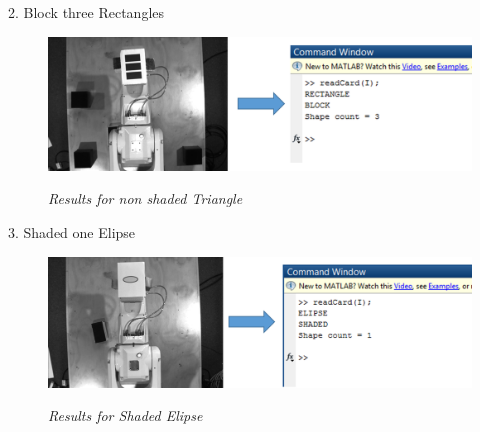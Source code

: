 2. Block three Rectangles
\begin{figure}[position = here]
	\begin{centering}
		\includegraphics[scale=0.5]{./sachiths_images/image8.png}\\
		\caption[]{\textit{Results for non shaded Triangle}}
	\end{centering}
\end{figure}

3. Shaded one Elipse
\begin{figure}[position = here]
	\begin{centering}
		\includegraphics[scale=0.5]{./sachiths_images/image10.png}\\
		\caption[]{\textit{Results for Shaded Elipse}}
	\end{centering}
\end{figure}

